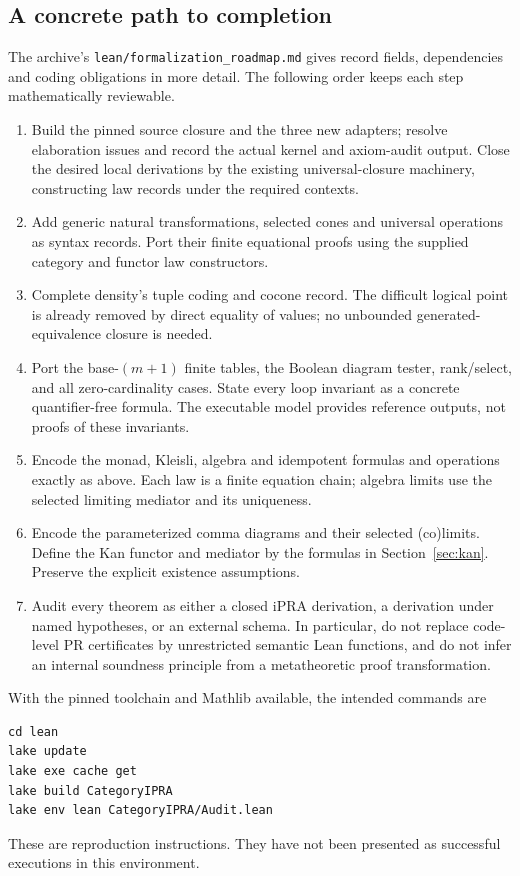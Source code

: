 \subsection{A concrete path to completion}
The archive's \texttt{lean/formalization\_roadmap.md} gives record fields,
dependencies and coding obligations in more detail. The following order
keeps each step mathematically reviewable.
\begin{enumerate}
\item Build the pinned source closure and the three new adapters; resolve
elaboration issues and record the actual kernel and axiom-audit output.
Close the desired local derivations by the existing universal-closure
machinery, constructing law records under the required contexts.
\item Add generic natural transformations, selected cones and universal
operations as syntax records. Port their finite equational proofs using
the supplied category and functor law constructors.
\item Complete density's tuple coding and cocone record. The difficult
logical point is already removed by direct equality of values; no
unbounded generated-equivalence closure is needed.
\item Port the base-$(m+1)$ finite tables, the Boolean diagram tester,
rank/select, and all zero-cardinality cases. State every loop invariant
as a concrete quantifier-free formula. The executable model provides
reference outputs, not proofs of these invariants.
\item Encode the monad, Kleisli, algebra and idempotent formulas and
operations exactly as above. Each law is a finite equation chain;
algebra limits use the selected limiting mediator and its uniqueness.
\item Encode the parameterized comma diagrams and their selected
(co)limits. Define the Kan functor and mediator by the formulas in
Section~\ref{sec:kan}. Preserve the explicit existence assumptions.
\item Audit every theorem as either a closed iPRA derivation, a derivation
under named hypotheses, or an external schema. In particular, do not
replace code-level PR certificates by unrestricted semantic Lean
functions, and do not infer an internal soundness principle from a
metatheoretic proof transformation.
\end{enumerate}

With the pinned toolchain and Mathlib available, the intended commands are
\begin{verbatim}
cd lean
lake update
lake exe cache get
lake build CategoryIPRA
lake env lean CategoryIPRA/Audit.lean
\end{verbatim}
These are reproduction instructions. They have not been presented as
successful executions in this environment.

